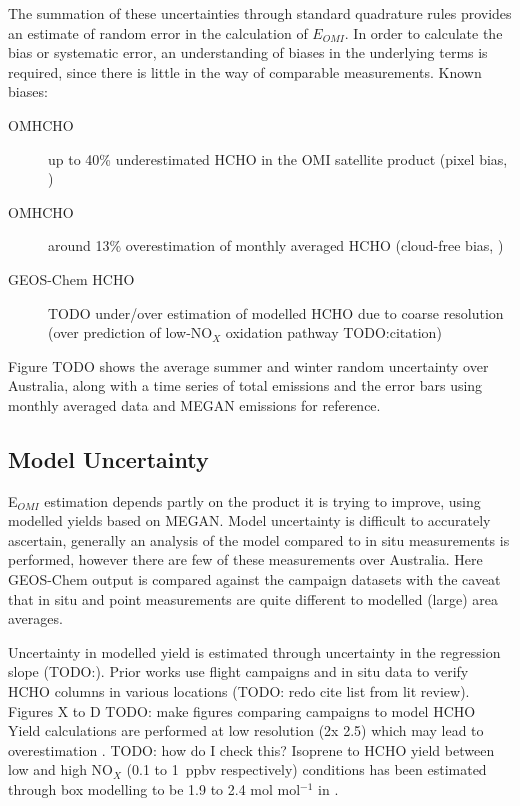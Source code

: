     The summation of these uncertainties through standard quadrature rules provides an estimate of random error in the calculation of $E_{OMI}$.
    In order to calculate the bias or systematic error, an understanding of biases in the underlying terms is required, since there is little in the way of comparable measurements.
    Known biases: 
    \begin{description}
      \item[OMHCHO] up to 40\% underestimated HCHO in the OMI satellite product (pixel bias, \parencite{Zhu2016,DeSmedt2015,Barkley2013})
      \item[OMHCHO] around 13\% overestimation of monthly averaged HCHO (cloud-free bias, \parencite{Surl2018})
      \item[GEOS-Chem HCHO] TODO under/over estimation of modelled HCHO due to coarse resolution (over prediction of low-NO$_X$ oxidation pathway TODO:citation)
    \end{description}
    
    Figure TODO shows the average summer and winter random uncertainty over Australia, along with a time series of total emissions and the error bars using monthly averaged data and MEGAN emissions for reference.
  
  \subsection{Model Uncertainty}
    \label{BioIsop:uncertainty:Model}
    
    E$_{OMI}$ estimation depends partly on the product it is trying to improve, using modelled yields based on MEGAN.
    Model uncertainty is difficult to accurately ascertain, generally an analysis of the model compared to in situ measurements is performed, however there are few of these measurements over Australia.
    Here GEOS-Chem output is compared against the campaign datasets with the caveat that in situ and point measurements are quite different to modelled (large) area averages.
    
    Uncertainty in modelled yield is estimated through uncertainty in the regression slope (TODO:).
    Prior works use flight campaigns and in situ data to verify HCHO columns in various locations (TODO: redo cite list from lit review).
    Figures X to D TODO: make figures comparing campaigns to model HCHO
    Yield calculations are performed at low resolution (2\degr x 2.5\degr) which may lead to overestimation \parencite{Yu2016}.
    TODO: how do I check this?
    Isoprene to HCHO yield between low and high NO$_X$ (0.1 to 1~ppbv respectively) conditions has been estimated through box modelling to be 1.9 to 2.4 mol mol$^{-1}$ in \textcite{Bauwens2016}.
    
